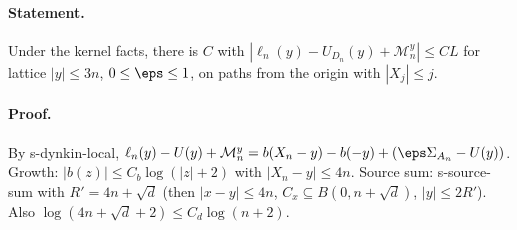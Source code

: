 \paragraph{Statement.} Under the kernel facts, there is $C$ with $|\ell_n(y)-U_{D_n}(y)+\mathcal M^y_n|\leq CL$ for lattice $|y|\leq3n$, $0\leq\eps\leq1$, on paths from the origin with
$|X_j|\leq j$.
\paragraph{Proof.} By s-dynkin-local, $\ell_n(y)-U(y)+\mathcal M^y_n=b(X_n-y)-b(-y)+(\eps\Sigma_{A_n}-U(y))$. Growth: $|b(z)|\leq C_b\log(|z|+2)$ with $|X_n-y|\leq4n$. Source sum: s-source-sum
with $R'=4n+\sqrt d$ (then $|x-y|\leq4n$, $C_x\subseteq B(0,n+\sqrt d)$, $|y|\leq2R'$). Also $\log(4n+\sqrt d+2)\leq C_d\log(n+2)$.
